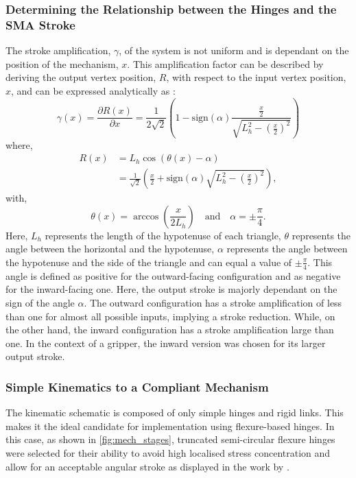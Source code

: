 \subsubsection{Determining the Relationship between the Hinges and the SMA Stroke}
The stroke amplification, $\gamma$, of the system is not uniform and is dependant on the position of the mechanism, $x$. This amplification factor can be described by deriving the output vertex position, $R$, with respect to the input vertex position, $x$, and can be expressed analytically as :
\begin{equation}
\gamma(x) = \frac{\partial R(x)}{\partial x} = \frac{1}{2\sqrt{2}}\left(1-\text{sign}(\alpha)\frac{\frac{x}{2}}{\sqrt{L_{h}^2-\left(\frac{x}{2}\right)^2}} \right)
\label{eq:1}
\end{equation}
where,
\begin{equation}
\begin{split}
    R(x) &= L_{h}\cos\left(\theta(x) - \alpha\right)\\
     &= \frac{1}{\sqrt{2}} \left(\frac{x}{2} +\text{sign}(\alpha) \sqrt{L_{h}^2-\left(\frac{x}{2}\right)^2}\right),
    \label{eq:7}
\end{split}
\end{equation}
with,
\begin{equation}
\theta(x) = \arccos{\left(\frac{x}{2L_{h}}\right)} \quad \text{and} \quad \alpha=\pm\frac{\pi}{4}.
\label{eq:theta}
\end{equation}
Here, $L_h$ represents the length of the hypotenuse of each triangle, $\theta$ represents the angle between the horizontal and the hypotenuse, $\alpha$ represents the angle between the hypotenuse and the side of the triangle and can equal a value of $\pm\frac{\pi}{4}$. This angle is defined as positive for the outward-facing configuration and as negative for the inward-facing one. Here, the output stroke is majorly dependant on the sign of the angle $\alpha$. The outward configuration has a stroke amplification of less than one for almost all possible inputs, implying a stroke reduction. While, on the other hand, the inward configuration has a stroke amplification large than one. In the context of a gripper, the inward version was chosen for its larger output stroke.

\subsubsection{Simple Kinematics to a Compliant Mechanism}
The kinematic schematic is composed of only simple hinges and rigid links. This makes it the ideal candidate for implementation using flexure-based hinges. In this case, as shown in \cref{fig:mech_stages}, truncated semi-circular flexure hinges were selected for their ability to avoid high localised stress concentration and allow for an acceptable angular stroke as displayed in the work by \todocite.

